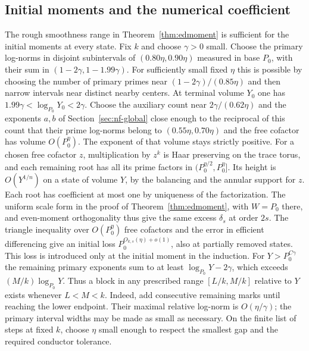 \documentclass[11pt,letterpaper]{article}
\theoremstyle{definition}
\numberwithin{equation}{section}
\begin{document}
\subsection{Initial moments and the numerical coefficient}
The rough smoothness range in Theorem~\ref{thm:edmoment} is sufficient
for the initial moments at every state. Fix $k$ and choose $\gamma>0$
small. Choose the primary log-norms in disjoint subintervals of
$(0.80\eta,0.90\eta)$ measured in base $P_0$, with their sum
in $(1-2\gamma,1-1.99\gamma)$. For sufficiently small fixed
$\eta$ this is possible by choosing the number of primary primes
near $(1-2\gamma)/(0.85\eta)$ and then narrow intervals near
distinct nearby centers. At terminal volume $Y_0$ one has
$1.99\gamma<\log_{P_0}Y_0<2\gamma$. Choose the auxiliary count
near $2\gamma/(0.62\eta)$ and the exponents $a,b$ of
Section~\ref{sec:nf-global} close enough to the reciprocal of
this count that their prime log-norms belong to
$(0.55\eta,0.70\eta)$ and the free cofactor has volume $O(P_0^\eta)$.
The exponent of that volume stays strictly positive. For a chosen
free cofactor $z$, multiplication by $z^k$ is Haar preserving on
the trace torus, and each remaining root has all its prime factors
in $(P_0^{\eta/2},P_0^\eta]$. Its height is $O(Y^{1/n})$ on a
state of volume $Y$, by the balancing and the annular support for
$z$. Each root has coefficient at most one by uniqueness of the
factorization. The uniform scale form in the proof of
Theorem~\ref{thm:edmoment}, with $W=P_0$ there, and even-moment
orthogonality thus give the same excess $\delta_s$ at order $2s$.
The triangle inequality over $O(P_0^\eta)$ free cofactors and the
error in efficient differencing give an initial loss
$P_0^{O_{k,s}(\eta)+o(1)}$, also at partially removed states.
This loss is introduced only at the initial moment in the induction.
For $Y>P_0^{C\gamma}$ the remaining primary exponents sum to at
least $\log_{P_0}Y-2\gamma$, which exceeds
$(M/k)\log_{P_0}Y$. Thus a block in any prescribed range
$[L/k,M/k]$ relative to $Y$ exists whenever $L<M<k$. Indeed,
add consecutive remaining marks until reaching the lower endpoint.
Their maximal relative log-norm is $O(\eta/\gamma)$; the primary
interval widths may be made as small as necessary. On the finite
list of steps at fixed $k$, choose $\eta$ small enough to
respect the smallest gap and the required conductor tolerance.
\end{document}
